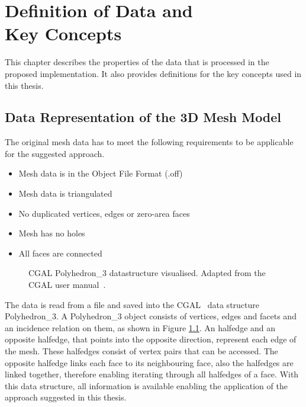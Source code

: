 \documentclass[draft,final]{vutinfth} %
\begin{document}
\chapter{Definition of Data and \\ Key Concepts}
\label{chap:definitions}
This chapter describes the properties of the data that is processed in the proposed implementation. It also provides definitions for the key concepts used in this thesis.

\section{Data Representation of the 3D Mesh Model}
The original mesh data has to meet the following requirements to be applicable for the suggested approach.

\begin{itemize}
    \item Mesh data is in the Object File Format (.off)
    \item Mesh data is triangulated
    \item No duplicated vertices, edges or zero-area faces
    \item Mesh has no holes
    \item All faces are connected
\end{itemize}

\begin{figure}

\caption{CGAL Polyhedron\_3 datastructure visualised. Adapted from the CGAL user manual~\cite{cgal:eb-19a}.}
\label{fig:cgal}
\end{figure}

The data is read from a file and saved into the CGAL~\cite{cgal:eb-19a} data structure Polyhedron\_3. A Polyhedron\_3 object consists of vertices, edges and facets and an incidence relation on them, as shown in Figure \ref{fig:cgal}. An halfedge and an opposite halfedge, that points into the opposite direction, represent each edge of the mesh. These halfedges consist of vertex pairs that can be accessed. The opposite halfedge links each face to its neighbouring face, also the halfedges are linked together, therefore enabling iterating through all halfedges of a face. With this data structure, all information is available enabling the application of the approach suggested in this thesis.
\end{document}
